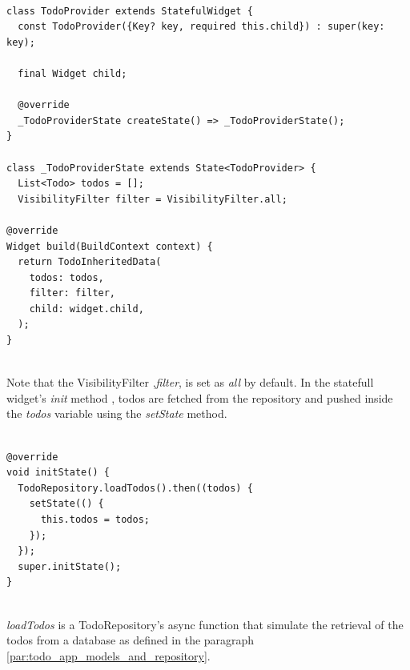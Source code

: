 \begin{code}
 \mbox{}

\label{code:2.18}
\begin{verbatim}

class TodoProvider extends StatefulWidget {
  const TodoProvider({Key? key, required this.child}) : super(key: key);

  final Widget child;

  @override
  _TodoProviderState createState() => _TodoProviderState();
}

class _TodoProviderState extends State<TodoProvider> {
  List<Todo> todos = [];
  VisibilityFilter filter = VisibilityFilter.all;

@override
Widget build(BuildContext context) {
  return TodoInheritedData(
    todos: todos,
    filter: filter,
    child: widget.child,
  );
}
\end{verbatim}
\end{code}
\mbox{}\\
Note that the VisibilityFilter ,\textit{filter}, is set as \textit{all} by default.
In the statefull widget's \textit{init} method , todos are fetched from the repository and pushed inside the \textit{todos} variable using the \textit{setState} method.
\mbox{}\\
\begin{code}
 \mbox{}

\label{code:2.19}
\begin{verbatim}

@override
void initState() {
  TodoRepository.loadTodos().then((todos) {
    setState(() {
      this.todos = todos;
    });
  });
  super.initState();
}
\end{verbatim}
\end{code}
\mbox{}\\
\textit{loadTodos }is a TodoRepository’s async function that simulate the retrieval of the todos from a database as defined in the paragraph \ref{par:todo_app_models_and_repository}.

